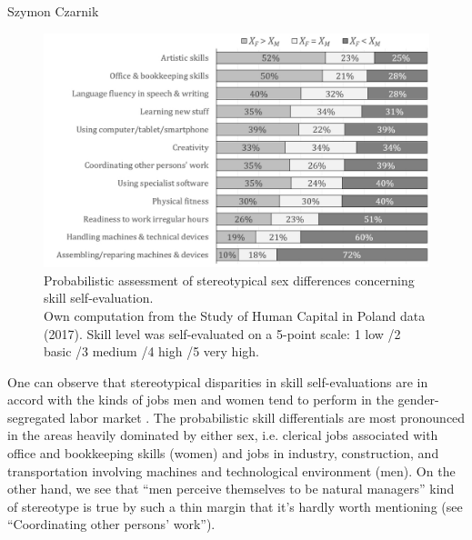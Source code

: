 \begin{artengenv}{Szymon Czarnik}
\begin{figure}[h]
	\centering
   \includegraphics[width=\textwidth]{ART_Czarnik/Czarnik-img022.jpg}
\caption{Probabilistic assessment of stereotypical sex differences concerning skill self-evaluation.\\
{\footnotesize Own computation from the Study of Human Capital in Poland data (2017). Skill level was self-evaluated on a 5-point scale: 1 low /2 basic /3 medium /4 high /5 very high.}}\label{fig6-czar}
\end{figure}

One can observe that stereotypical disparities in skill self-evaluations are in accord with the kinds of jobs men and women tend to perform in the gender-segregated labor market
\parencite[][]{czarnik_gender_2015}. %
 The probabilistic skill differentials are most pronounced in the areas heavily dominated by either sex, i.e. clerical jobs associated with office and bookkeeping skills (women) and jobs in industry, construction, and transportation involving machines and technological environment (men). On the other hand, we see that ``men perceive themselves to be natural managers'' kind of stereotype is true by such a thin margin that it's hardly worth mentioning (see ``Coordinating other persons' work'').


\end{artengenv}
